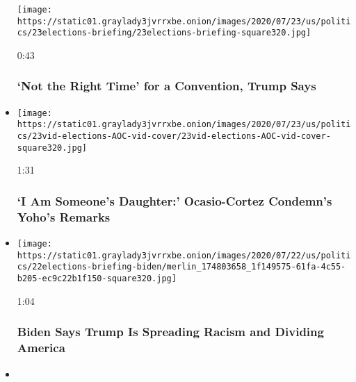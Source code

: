 \begin{itemize}
  \texttt{[image: https://static01.graylady3jvrrxbe.onion/images/2020/07/23/us/politics/23elections-briefing/23elections-briefing-square320.jpg]}

  0:43

  \hypertarget{not-the-right-time-for-a-convention-trump-says}{%
  \subsubsection{`Not the Right Time' for a Convention, Trump
  Says}\label{not-the-right-time-for-a-convention-trump-says}}
\item
  \href{https://www.nytimes3xbfgragh.onion/video/us/100000007253391/aoc-confronts-yoho.html?action=click\&module=video-series-bar\&region=header\&pgtype=Article\&playlistId=video/us-politics}{}

  \texttt{[image: https://static01.graylady3jvrrxbe.onion/images/2020/07/23/us/politics/23vid-elections-AOC-vid-cover/23vid-elections-AOC-vid-cover-square320.jpg]}

  1:31

  \hypertarget{i-am-someones-daughter-ocasio-cortez-condemns-yohos-remarks}{%
  \subsubsection{`I Am Someone's Daughter:' Ocasio-Cortez Condemn's
  Yoho's
  Remarks}\label{i-am-someones-daughter-ocasio-cortez-condemns-yohos-remarks}}
\item
  \href{https://www.nytimes3xbfgragh.onion/video/us/100000007251300/biden-trump-racist-divide-america.html?action=click\&module=video-series-bar\&region=header\&pgtype=Article\&playlistId=video/us-politics}{}

  \texttt{[image: https://static01.graylady3jvrrxbe.onion/images/2020/07/22/us/politics/22elections-briefing-biden/merlin\_174803658\_1f149575-61fa-4c55-b205-ec9c22b1f150-square320.jpg]}

  1:04

  \hypertarget{biden-says-trump-is-spreading-racism-and-dividing-america}{%
  \subsubsection{Biden Says Trump Is Spreading Racism and Dividing
  America}\label{biden-says-trump-is-spreading-racism-and-dividing-america}}
\item
  \href{https://www.nytimes3xbfgragh.onion/video/us/100000007251764/trump-surge-federal-law-enforcment.html?action=click\&module=video-series-bar\&region=header\&pgtype=Article\&playlistId=video/us-politics}{}


\end{itemize}
